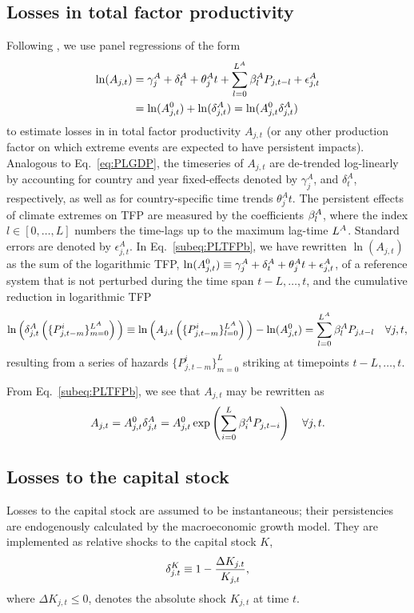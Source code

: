 \documentclass[preprint,3p,authoryear]{elsarticle}
\begin{document}
\subsection{Losses in total factor productivity}
\label{subsec:TFP}
Following \citet{BAK19}, we use panel regressions of the form
\begin{subequations}
\label{eq:PLTFP}
\begin{align}
\ln(A_{j,t}) &= \gamma^{A}_j + \delta^A_{t} + \theta^{A}_j t + \sum_{l=0}^{L^A}\beta^A_{l}P_{j,t-l}+\epsilon^{A}_{j,t}\notag\\
             &= \ln(A^{0}_{j,t})+
               \ln(\delta^A_{j,t})=\ln(A^{0}_{j,t}\delta^A_{j,t})\label{subeq:PLTFPb}
\end{align}
\end{subequations}
to estimate losses in in total factor productivity $A_{j,t}$ (or any other production factor on which extreme events are expected to have persistent impacts).
Analogous to Eq.~\eqref{eq:PLGDP}, the timeseries of $A_{j,t}$ are de-trended log-linearly by accounting for country and year fixed-effects denoted by $\gamma^{A}_j$, and $\delta^{A}_t$, respectively, as well as for country-specific time trends $\theta^{A}_j t$. The persistent effects of climate extremes on TFP are measured by the coefficients $\beta^A_l$, where the index $l\in[0,\ldots,L]$ numbers the time-lags up to the maximum lag-time $L^A$. Standard errors are denoted by $\epsilon^{A}_{j,t}$. In Eq.~\eqref{subeq:PLTFPb}, we have rewritten $\ln(A_{j,t})$  as the sum of the logarithmic TFP, $\ln(A^{0}_{j,t})\equiv\gamma^A_j+\delta^A_t+\theta^A_j t+\epsilon^A_{j,t}$, of a reference system that is not perturbed during the time span $t-L,\ldots,t$, and the cumulative reduction in logarithmic TFP
\begin{equation}
  \label{eq:delta}
  \ln\Big(\delta^A_{j,t}\left(\lbrace P_{j,t-m}^i\rbrace_{m=0}^{L^A}\right)\Big)\equiv \ln\Big(A_{j,t}\left(\lbrace P_{j,t-m}^i\rbrace_{l=0}^{L^A}\right)\Big)-\ln(A^{0}_{j,t})= \sum_{l=0}^{L^A}\beta^A_lP_{j,t-l}\quad\forall j,t,
\end{equation}
resulting from a series of hazards $\lbrace P_{j,t-m}^i\rbrace_{m=0}^L$ striking at timepoints  $t-L,\ldots,t$.

From Eq.~\eqref{subeq:PLTFPb}, we see that $A_{j,t}$ may be rewritten as
\begin{equation}
  \label{eq:TFP} A_{j,t}=A^{0}_{j,t}\delta^A_{j,t}=A^{0}_{j,t}\exp\left(\sum_{i=0}^{L}\beta^A_iP_{j,t-i}\right)\quad\forall j,t.
\end{equation}
\subsection{Losses to the capital stock}
\label{subsec:K}
Losses to the capital stock are assumed to be instantaneous; their persistencies are endogenously calculated by the macroeconomic growth model. They are implemented as relative shocks to the capital stock $K$,
\begin{equation}
  \label{eq:dk}
  \delta^K_{j.t}\equiv 1-\frac{\Delta K_{j.t}}{K_{j,t}}, 
\end{equation}
where $\Delta K_{j,t}\leq 0$, denotes the absolute shock $K_{j,t}$ at time $t$.
\end{document}

